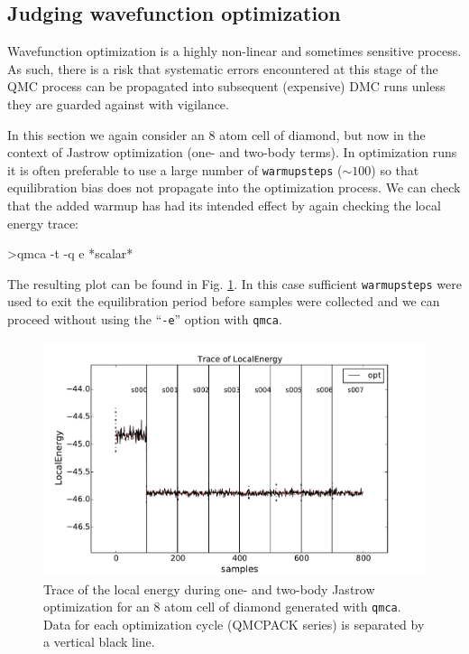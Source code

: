 \subsection{Judging wavefunction optimization}
\label{sec:qmca_judge_opt}
Wavefunction optimization is a highly non-linear and sometimes 
sensitive process.  As such, there is a risk that systematic 
errors encountered at this stage of the QMC process can be propagated 
into subsequent (expensive) DMC runs unless they are guarded against 
with vigilance.

In this section we again consider an 8 atom cell of diamond, but 
now in the context of Jastrow optimization (one- and two-body terms). 
In optimization runs it is often preferable to use a large number 
of \texttt{warmupsteps} ($\sim 100$) so that equilibration bias does 
not propagate into the optimization process.  We can check that 
the added warmup has had its intended effect by again checking the 
local energy trace:
\begin{shade}
>qmca -t -q e *scalar*
\end{shade}
\noindent
The resulting plot can be found in Fig. \ref{fig:qmca_judge_opt}. 
In this case sufficient \texttt{warmupsteps} were used to exit 
the equilibration period before samples were collected and we can 
proceed without using the ``\texttt{-e}'' option with \texttt{qmca}.

\begin{figure}
\begin{center}
\includegraphics[trim = 0mm 0mm 0mm 0mm, clip,width=0.9\columnwidth]{figures/qmca_judge_opt.pdf}
\end{center}
\caption{Trace of the local energy during one- and two-body Jastrow optimization for an 8 atom cell of diamond generated with \texttt{qmca}.  Data for each optimization cycle (QMCPACK series) is separated by a vertical black line.
\label{fig:qmca_judge_opt}
}
\end{figure}

